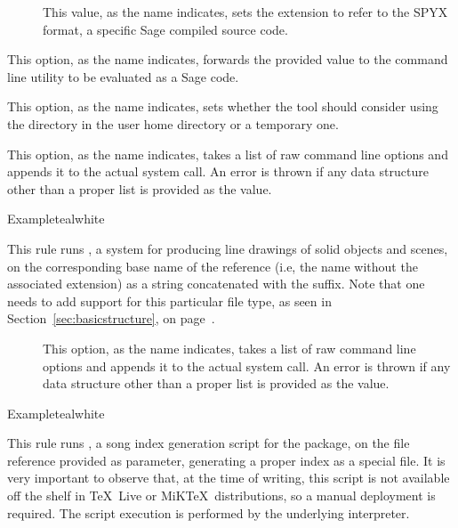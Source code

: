 \begin{description}
\begin{description}
\begin{description}
\item[] This value, as the name indicates, sets the extension to refer to the SPYX format, a specific Sage compiled source code.
\end{description}

\item[\abox{command}] This option, as the name indicates, forwards the provided value to the command line utility to be evaluated as a Sage code.

\item[\rpsbox{dotsage}] This option, as the name indicates, sets whether the tool should consider using the  directory in the user home directory or a temporary one.

\item[\abox{options}] This option, as the name indicates, takes a list of raw command line options and appends it to the actual system call. An error is thrown if any data structure other than a proper list is provided as the value.
\end{description}

\begin{codebox}{Example}{teal}{\icnote}{white}
\end{codebox}

\item[\rulebox{sketch}]
This rule runs , a system for producing line drawings of solid objects and scenes, on the corresponding base name of the  reference (i.e, the name without the associated extension) as a string concatenated with the  suffix. Note that one needs to add support for this particular file type, as seen in Section~\ref{sec:basicstructure}, on page~\pageref{sec:basicstructure}.

\begin{description}
\item[] This option, as the name indicates, takes a list of raw command line options and appends it to the actual system call. An error is thrown if any data structure other than a proper list is provided as the value.
\end{description}

\begin{codebox}{Example}{teal}{\icnote}{white}
\end{codebox}

\item[\rulebox{songidx}]
This rule runs , a song index generation script for the  package, on the file reference provided as parameter, generating a proper index as a special  file. It is very important to observe that, at the time of writing, this script is not available off the shelf in \TeX\ Live or MiK\TeX\ distributions, so a manual deployment is required. The script execution is performed by the underlying  interpreter.


\end{description}
